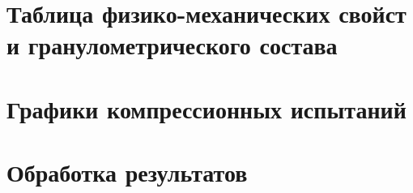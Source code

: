 \chapter{Таблица физико-механических свойст и гранулометрического состава}\label{app:tp}

\newpage

\newpage

\chapter{Графики компрессионных испытаний}\label{app:ct}


\chapter{Обработка результатов}\label{app:methods}
